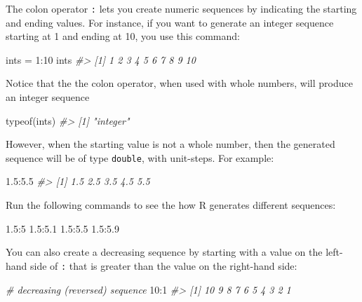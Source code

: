 \documentclass[
]{book}
\newenvironment{Shaded}{\begin{snugshade}}{\end{snugshade}}
\newcommand{\CommentTok}[1]{\textcolor[rgb]{0.56,0.35,0.01}{\textit{#1}}}
\newcommand{\DecValTok}[1]{\textcolor[rgb]{0.00,0.00,0.81}{#1}}
\newcommand{\FloatTok}[1]{\textcolor[rgb]{0.00,0.00,0.81}{#1}}
\newcommand{\FunctionTok}[1]{\textcolor[rgb]{0.00,0.00,0.00}{#1}}
\newcommand{\NormalTok}[1]{#1}
\newcommand{\OtherTok}[1]{\textcolor[rgb]{0.56,0.35,0.01}{#1}}
\newcommand{\SpecialCharTok}[1]{\textcolor[rgb]{0.00,0.00,0.00}{#1}}
\begin{document}
The colon operator \texttt{:} lets you create numeric sequences by indicating the
starting and ending values. For instance, if you want to generate an integer
sequence starting at 1 and ending at 10, you use this command:

\begin{Shaded}
\begin{Highlighting}[]
\NormalTok{ints }\OtherTok{=} \DecValTok{1}\SpecialCharTok{:}\DecValTok{10}
\NormalTok{ints}
\CommentTok{\#\textgreater{}  [1]  1  2  3  4  5  6  7  8  9 10}
\end{Highlighting}
\end{Shaded}

Notice that the the colon operator, when used with whole numbers, will produce
an integer sequence

\begin{Shaded}
\begin{Highlighting}[]
\FunctionTok{typeof}\NormalTok{(ints)}
\CommentTok{\#\textgreater{} [1] "integer"}
\end{Highlighting}
\end{Shaded}

However, when the starting value is not a whole number, then the generated
sequence will be of type \texttt{double}, with unit-steps. For example:

\begin{Shaded}
\begin{Highlighting}[]
\FloatTok{1.5}\SpecialCharTok{:}\FloatTok{5.5}
\CommentTok{\#\textgreater{} [1] 1.5 2.5 3.5 4.5 5.5}
\end{Highlighting}
\end{Shaded}

Run the following commands to see the how R generates different sequences:

\begin{Shaded}
\begin{Highlighting}[]
\FloatTok{1.5}\SpecialCharTok{:}\DecValTok{5}
\FloatTok{1.5}\SpecialCharTok{:}\FloatTok{5.1}
\FloatTok{1.5}\SpecialCharTok{:}\FloatTok{5.5}
\FloatTok{1.5}\SpecialCharTok{:}\FloatTok{5.9}
\end{Highlighting}
\end{Shaded}

You can also create a decreasing sequence by starting with a value on the
left-hand side of \texttt{:} that is greater than the value on the right-hand side:

\begin{Shaded}
\begin{Highlighting}[]
\CommentTok{\# decreasing (reversed) sequence}
\DecValTok{10}\SpecialCharTok{:}\DecValTok{1}
\CommentTok{\#\textgreater{}  [1] 10  9  8  7  6  5  4  3  2  1}
\end{Highlighting}
\end{Shaded}
\end{document}
